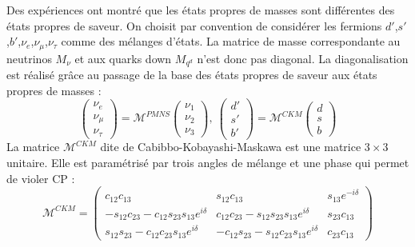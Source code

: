 Des expériences ont montré que les états propres de masses sont différentes des états propres de saveur. On choisit par convention de considérer les fermions $d'$,$s'$,$b'$,$\nu_{e}$,$\nu_{\mu}$,$\nu_{\tau}$ comme des mélanges d'états. La matrice de masse correspondante au neutrinos $M_{\nu}$ et aux quarks down $M_{q^d}$ n'est donc pas diagonal. La diagonalisation est réalisé grâce au passage de la base des états propres de saveur aux états propres de masses :
\begin{equation}
\begin{pmatrix} 
\nu_{e} \\ 
\nu_{\mu} \\ 
\nu_{\tau} 
\end{pmatrix}=\mathcal{M}^{PMNS}
\begin{pmatrix} 
\nu_{1}\\ 
\nu_{2}\\ 
\nu_{3}
\end{pmatrix},\ \begin{pmatrix} 
d' \\ 
s' \\ 
b' 
\end{pmatrix}=\mathcal{M}^{CKM}
\begin{pmatrix} 
d \\ 
s\\ 
b
\end{pmatrix}
\end{equation} 
La matrice $\mathcal{M}^{CKM}$ dite de Cabibbo-Kobayashi-Maskawa est une matrice $3\times3$ unitaire. Elle est paramétrisé par trois angles de mélange et une phase qui permet de violer CP :
\begin{equation}
\mathcal{M}^{CKM}= 
\begin{pmatrix} 
c_{12}c_{13} & s_{12}c_{13} & s_{13}e^{-i\delta} \\
-s_{12}c_{23}-c_{12}s_{23}s_{13}e^{i\delta} & c_{12}c_{23}-s_{12}s_{23}s_{13}e^{i\delta} & s_{23}c_{13} \\
s_{12}s_{23}-c_{12}c_{23}s_{13}e^{i\delta} & -c_{12}s_{23}-s_{12}c_{23}s_{13}e^{i\delta} & c_{23}c_{13}
\end{pmatrix}
\end{equation} 
 

